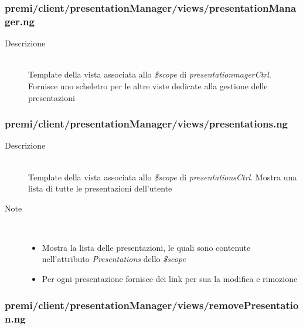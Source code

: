 \subsubsection{premi/client/presentationManager/views/presentationManager.ng}

\begin{description}
\item[Descrizione] \hfill \\
	Template della vista associata allo \textit{\$scope} di \textit{presentationmagerCtrl}. Fornisce uno scheletro per le altre viste dedicate alla gestione delle presentazioni
\end{description}



\subsubsection{premi/client/presentationManager/views/presentations.ng}

\begin{description}
\item[Descrizione] \hfill \\
	Template della vista associata allo \textit{\$scope} di \textit{presentationsCtrl}. Mostra una lista di tutte le presentazioni dell'utente
\item[Note] \hfill \\
	\begin{itemize}
			\item Mostra la lista delle presentazioni, le quali sono contenute nell'attributo \textit{Presentations} dello \textit{\$scope}
			\item Per ogni presentazione fornisce dei link per sua la modifica e rimozione
	\end{itemize}
\end{description}



\subsubsection{premi/client/presentationManager/views/removePresentation.ng}

